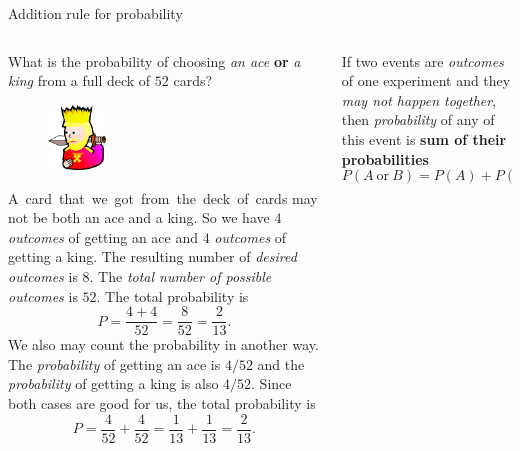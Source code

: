\documentclass[9pt,aspectratio=169]{beamer}
\begin{document}
\begin{frame}{Addition rule for probability}
  \begin{columns}[T]
    \begin{column}{0.5\textwidth}
      \begin{problem}
        What is the probability of choosing \emph{an ace} \textbf{or} \emph{a king} from a full deck of $52$ cards?
      \end{problem}
      \begin{figure}%
        \vspace{-1em}
        \includegraphics[width=0.25\textwidth]{03 - Probability/king-clip-art.png}
      \end{figure}
      \mbox{A card that we got from the deck of cards} may not be both an ace and a king. So we have $4$ \emph{outcomes} of getting an ace and $4$ \emph{outcomes} of getting a king. The resulting number of \emph{desired outcomes} is $8$. The \emph{total number of possible outcomes} is $52$.
      The total probability is
      \[ P = \frac{4 + 4}{52} = \frac{8}{52} = \frac{2}{13}. \]
      We also may count the probability in another way. The \emph{probability} of getting an ace is $4/52$ and the \emph{probability} of getting a king is also $4/52$. Since both cases are good for us, the total probability is
      \[ P = \frac{4}{52} + \frac{4}{52} = \frac{1}{13} + \frac{1}{13} = \frac{2}{13}. \]
    \end{column}
    \begin{column}{0.5\textwidth}
      \begin{definition}
        If two events are \emph{outcomes} of one experiment and they \emph{may not happen together}, then \emph{probability} of any of this event is \textbf{sum of their probabilities}
        \[ P(A\ \text{or}\ B) = P(A) + P(B). \]
        \vspace*{-2.5ex}          
      \end{definition}


\end{column}
\end{columns}
\end{frame}
\end{document}
